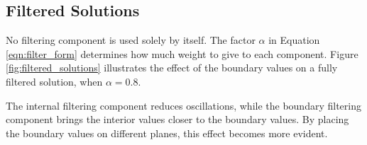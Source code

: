 \subsection{Filtered Solutions}
No filtering component is used solely by itself. The factor $\alpha$ in Equation \ref{eqn:filter_form} determines how much weight to give to each component. Figure \ref{fig:filtered_solutions} illustrates the effect of the boundary values on a fully filtered solution, when $\alpha = 0.8$.

The internal filtering component reduces oscillations, while the boundary filtering component brings the interior values closer to the boundary values. By placing the boundary values on different planes, this effect becomes more evident.

\begin{figure*}
\hspace{-1cm}
\hfill
{}
\caption{Solution values after filtering with both internal and boundary components, $\vec{\bar{v}} = \alpha\mat{T}\vec{v} + (1-\alpha)\mat{B}\vec{v^*}$, where $\alpha = 0.8$, ${v_i} = \sin{(k\xi_{i1})} + \cos{(k\xi_{i2})} $, $k=500$, $\vec{v^*} = \beta (-\vec{\xi^*_1} + \vec{\xi^*_2})$. Hollow black circles show the unfiltered solution at the interior points, transparent colored surface is the polynomial representation of the unfiltered solution, filled black circles show the filtered values of the solution at the interior points, hollow red squares show the value of the solution at the boundary points, and the meshed surface shows the polynomial representation of the filtered solution.}
\label{fig:filtered_solutions}

\end{figure*}